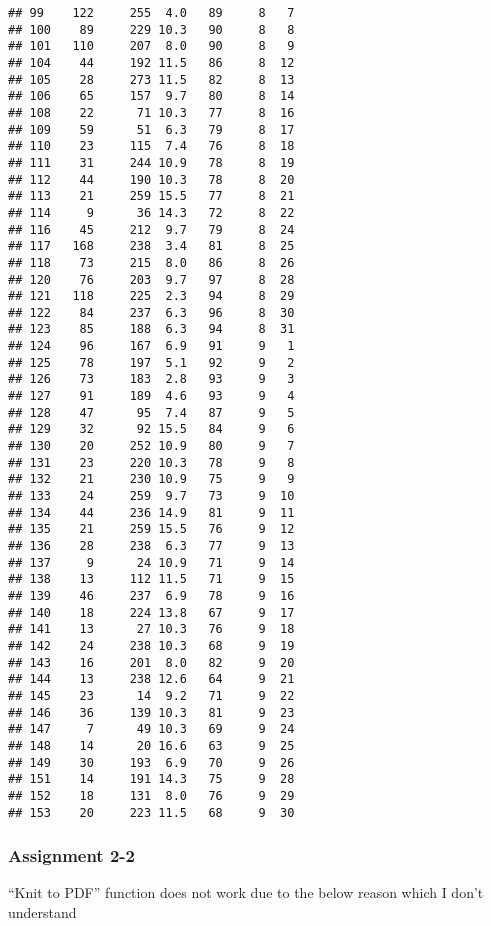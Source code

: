 \documentclass[
]{article}
\begin{document}
\begin{verbatim}
## 99    122     255  4.0   89     8   7
## 100    89     229 10.3   90     8   8
## 101   110     207  8.0   90     8   9
## 104    44     192 11.5   86     8  12
## 105    28     273 11.5   82     8  13
## 106    65     157  9.7   80     8  14
## 108    22      71 10.3   77     8  16
## 109    59      51  6.3   79     8  17
## 110    23     115  7.4   76     8  18
## 111    31     244 10.9   78     8  19
## 112    44     190 10.3   78     8  20
## 113    21     259 15.5   77     8  21
## 114     9      36 14.3   72     8  22
## 116    45     212  9.7   79     8  24
## 117   168     238  3.4   81     8  25
## 118    73     215  8.0   86     8  26
## 120    76     203  9.7   97     8  28
## 121   118     225  2.3   94     8  29
## 122    84     237  6.3   96     8  30
## 123    85     188  6.3   94     8  31
## 124    96     167  6.9   91     9   1
## 125    78     197  5.1   92     9   2
## 126    73     183  2.8   93     9   3
## 127    91     189  4.6   93     9   4
## 128    47      95  7.4   87     9   5
## 129    32      92 15.5   84     9   6
## 130    20     252 10.9   80     9   7
## 131    23     220 10.3   78     9   8
## 132    21     230 10.9   75     9   9
## 133    24     259  9.7   73     9  10
## 134    44     236 14.9   81     9  11
## 135    21     259 15.5   76     9  12
## 136    28     238  6.3   77     9  13
## 137     9      24 10.9   71     9  14
## 138    13     112 11.5   71     9  15
## 139    46     237  6.9   78     9  16
## 140    18     224 13.8   67     9  17
## 141    13      27 10.3   76     9  18
## 142    24     238 10.3   68     9  19
## 143    16     201  8.0   82     9  20
## 144    13     238 12.6   64     9  21
## 145    23      14  9.2   71     9  22
## 146    36     139 10.3   81     9  23
## 147     7      49 10.3   69     9  24
## 148    14      20 16.6   63     9  25
## 149    30     193  6.9   70     9  26
## 151    14     191 14.3   75     9  28
## 152    18     131  8.0   76     9  29
## 153    20     223 11.5   68     9  30
\end{verbatim}

\hypertarget{assignment-2-2-1}{%
\subsubsection{Assignment 2-2}\label{assignment-2-2-1}}

``Knit to PDF'' function does not work due to the below reason which I
don't understand
\end{document}
